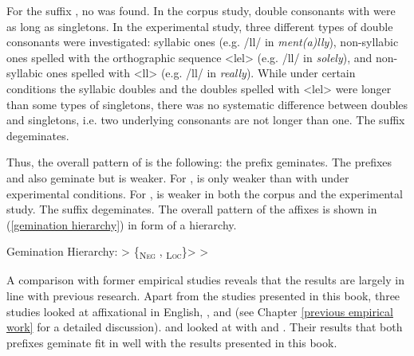 For the suffix , no  was found. In the corpus study, double consonants with  were as long as singletons. In the experimental study, three different types of double consonants were investigated: syllabic ones (e.g. /ll/ in  \textit{ment(a)lly}), non-syllabic ones spelled with the orthographic sequence <lel> (e.g. /ll/ in \textit{solely}), and non-syllabic ones spelled with <ll> (e.g. /ll/ in \textit{really}). While under certain conditions the syllabic doubles and the doubles spelled with <lel> were longer than some types of singletons, there was no systematic difference between doubles and singletons, i.e. two underlying consonants are not longer than one. The suffix  degeminates.



Thus, the overall pattern of  is the following: the prefix  geminates. The prefixes  and   also geminate but  is weaker. For ,  is only weaker than  with  under experimental conditions. For ,  is weaker in both the corpus and the experimental study. The suffix  degeminates. The overall  pattern of the affixes is shown in (\ref{gemination hierarchy}) in form of a hierarchy.


\begin{exe}
	
	\ex \label{gemination hierarchy} {Gemination Hierarchy}: \hspace*{0.5cm}	{ > \{\textsubscript{\textsc{Neg}} ,  \textsubscript{\textsc{Loc}}\}>  > }
	
\end{exe}


A comparison with former empirical studies reveals that the results are largely in line with previous research. 
Apart from the studies presented in this book, three studies looked at affixational  in English, \cite{Kaye.2005}, \cite{Oh.2012} and \cite{Kotzor.2016} (see Chapter \ref{previous empirical work} for a detailed discussion). 
\cite{Kaye.2005} and \cite{Oh.2012} looked at  with  and . Their results that both prefixes geminate fit in well with the results presented in this book.


